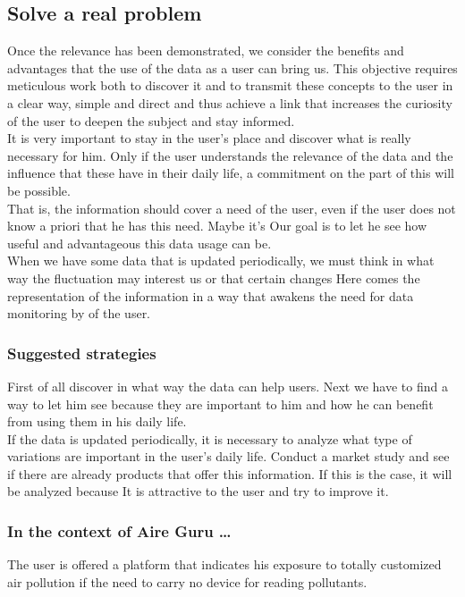 \subsection{Solve a real problem}
Once the relevance has been demonstrated, we consider the benefits and advantages that the use of the data as a user can bring us.
This objective requires meticulous work both to discover it and to transmit these concepts to the user in a clear way,
simple and direct and thus achieve a link that increases the curiosity of the user to deepen the subject and
stay informed.\\

It is very important to stay in the user's place and discover what is really necessary for him. Only if the user understands the relevance of
the data and the influence that these have in their daily life, a commitment on the part of this will be possible.\\

That is, the information should cover a need of the user, even if the user does not know a priori that he has this need. Maybe it's
Our goal is to let he see how useful and advantageous this data usage can be.\\

When we have some data that is updated periodically, we must think in what way the fluctuation may interest us or that certain
changes Here comes the representation of the information in a way that awakens the need for data monitoring by
of the user.

\subsubsection*{Suggested strategies} 
First of all discover in what way the data can help users. Next we have to find a way to let him see
because they are important to him and how he can benefit from using them in his daily life.\\

If the data is updated periodically, it is necessary to analyze what type of variations are important in the user's daily life.
Conduct a market study and see if there are already products that offer this information. If this is the case, it will be analyzed because
It is attractive to the user and try to improve it.

\subsubsection*{In the context of Aire Guru \ldots} 
The user is offered a platform that indicates his exposure to totally customized air pollution if the need to carry
no device for reading pollutants.\\



